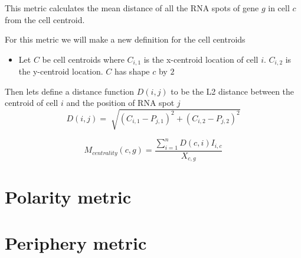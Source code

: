 \documentclass[a4paper,12pt]{article}
\begin{document}
This metric calculates the mean distance of all the RNA spots of gene $g$ in cell $c$ from the cell centroid.

For this metric we will make a new definition for the cell centroids

\begin{itemize}
    \item Let $C$ be cell centroids where $C_{i,1}$ is the x-centroid location of cell $i$. $C_{i,2}$ is the y-centroid location. $C$ has shape $c$ by $2$
\end{itemize}

Then lets define a distance function $D(i,j)$ to be the L2 distance between the centroid of cell $i$ and the position of RNA spot $j$
\begin{equation}
    D(i,j) = \sqrt[]{(C_{i,1}-P_{j,1})^{2}+(C_{i,2}-P_{j,2})^{2}}
\end{equation}

\begin{equation}
    M_{centrality}(c,g) = \frac{\sum_{i=1}^{n}D(c,i)I_{i,c}}{X_{c,g}}
\end{equation}

\section{Polarity metric}

\section{Periphery metric}
\end{document}
